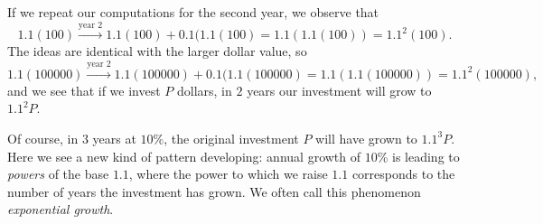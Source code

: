 \documentclass[nooutcomes]{ximera}
\begin{document}
If we repeat our computations for the second year, we observe that%
\begin{equation*}
1.1(100) \xrightarrow{\text{year } 2} 1.1(100) + 0.1(1.1(100) = 1.1(1.1(100)) = 1.1^2 (100)\text{.}
\end{equation*}
The ideas are identical with the larger dollar value, so%
\begin{equation*}
1.1(100000) \xrightarrow{\text{year } 2} 1.1(100000) + 0.1(1.1(100000) = 1.1(1.1(100000)) = 1.1^2 (100000)\text{,}
\end{equation*}
and we see that if we invest $P$ dollars, in $2$ years our investment will grow to $1.1^2 P$.%

Of course, in $3$ years at $10$\%, the original investment $P$ will have grown to $1.1^3 P$.  Here we see a new kind of pattern developing:  annual growth of $10$\% is leading to \emph{powers} of the base $1.1$, where the power to which we raise $1.1$ corresponds to the number of years the investment has grown.  We often call this phenomenon \emph{exponential growth}. 
\end{document}
